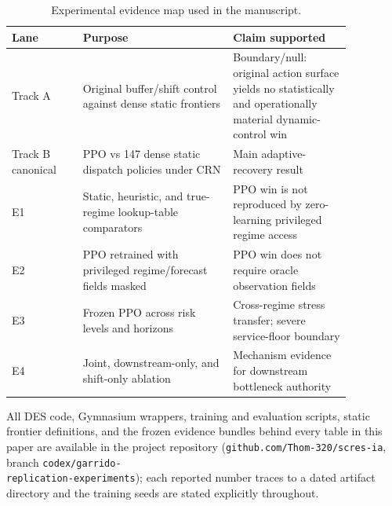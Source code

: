 \begin{table}[htbp]
\centering
\caption{Experimental evidence map used in the manuscript.}
\label{tab:evidence_map}
\begin{tabular}{>{\raggedright\arraybackslash}p{0.18\linewidth}>{\raggedright\arraybackslash}p{0.38\linewidth}>{\raggedright\arraybackslash}p{0.30\linewidth}}
\toprule
Lane & Purpose & Claim supported \\
\midrule
Track A & Original buffer/shift control against dense static frontiers & Boundary/null: original action surface yields no statistically and operationally material dynamic-control win \\
Track B canonical & PPO vs 147 dense static dispatch policies under CRN & Main adaptive-recovery result \\
E1 & Static, heuristic, and true-regime lookup-table comparators & PPO win is not reproduced by zero-learning privileged regime access \\
E2 & PPO retrained with privileged regime/forecast fields masked & PPO win does not require oracle observation fields \\
E3 & Frozen PPO across risk levels and horizons & Cross-regime stress transfer; severe service-floor boundary \\
E4 & Joint, downstream-only, and shift-only ablation & Mechanism evidence for downstream bottleneck authority \\
\bottomrule
\end{tabular}
\end{table}

All DES code, Gymnasium wrappers, training and evaluation scripts, static
frontier definitions, and the frozen evidence bundles behind every table
in this paper are available in the project repository
(\texttt{github.com/Thom-320/scres-ia}, branch
\texttt{codex/garrido-}\\\texttt{replication-experiments}); each reported number
traces to a dated artifact directory and the training seeds are stated
explicitly throughout.

